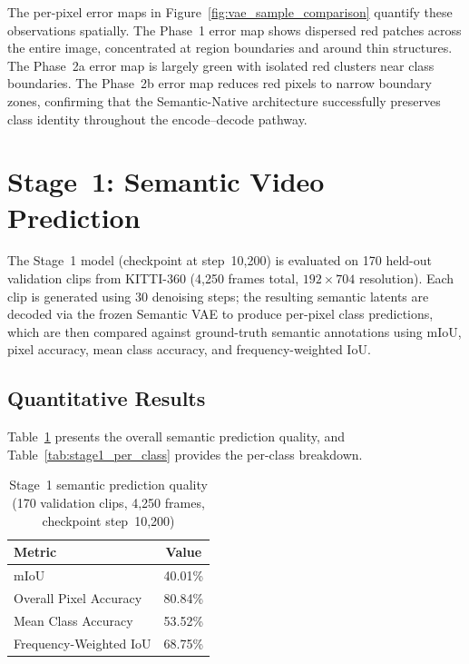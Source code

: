 The per-pixel error maps in Figure~\ref{fig:vae_sample_comparison} quantify these observations spatially. The Phase~1 error map shows dispersed red patches across the entire image, concentrated at region boundaries and around thin structures. The Phase~2a error map is largely green with isolated red clusters near class boundaries. The Phase~2b error map reduces red pixels to narrow boundary zones, confirming that the Semantic-Native architecture successfully preserves class identity throughout the encode--decode pathway.

\FloatBarrier
\section{Stage~1: Semantic Video Prediction}
\label{sec:stage1_results}

The Stage~1 model (checkpoint at step~10{,}200) is evaluated on 170 held-out validation clips from KITTI-360 (4{,}250 frames total, $192 \times 704$ resolution). Each clip is generated using 30 denoising steps; the resulting semantic latents are decoded via the frozen Semantic VAE to produce per-pixel class predictions, which are then compared against ground-truth semantic annotations using mIoU, pixel accuracy, mean class accuracy, and frequency-weighted IoU.

\subsection{Quantitative Results}
\label{subsec:stage1_quantitative}

Table~\ref{tab:stage1_overall} presents the overall semantic prediction quality, and Table~\ref{tab:stage1_per_class} provides the per-class breakdown.

\begin{table}[t]
    \centering
    \caption{Stage~1 semantic prediction quality (170 validation clips, 4{,}250 frames, checkpoint step~10{,}200)}
    \label{tab:stage1_overall}
    \begin{tabular}{lc}
        \toprule
        \textbf{Metric} & \textbf{Value} \\
        \midrule
        mIoU & 40.01\% \\
        Overall Pixel Accuracy & 80.84\% \\
        Mean Class Accuracy & 53.52\% \\
        Frequency-Weighted IoU & 68.75\% \\
        \bottomrule
    \end{tabular}
\end{table}

